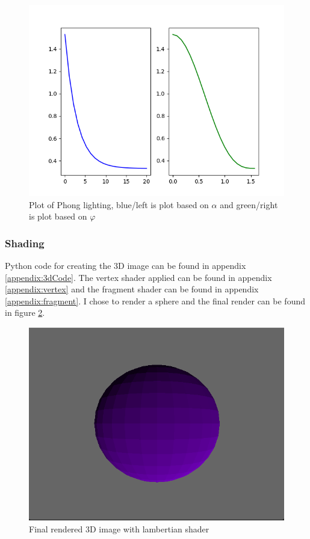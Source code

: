 \documentclass{article}
\begin{document}
\begin{figure}[H]
    \centering
    \includegraphics[width=1\textwidth]{phong.png} 
    \caption{Plot of Phong lighting, blue/left is plot based on $\alpha$ and green/right is plot based on $\varphi$}
    \label{fig:pho}
\end{figure}

\subsubsection{Shading}
Python code for creating the 3D image can be found in appendix \ref{appendix:3dCode}. The vertex shader applied can be found in appendix \ref{appendix:vertex} and the fragment shader can be found in appendix \ref{appendix:fragment}. I chose to render a sphere and the final render can be found in figure \ref{fig:sphere}.

\begin{figure}[H]
    \centering
    \includegraphics[width=1\textwidth]{sphere.png} 
    \caption{Final rendered 3D image with lambertian shader}
    \label{fig:sphere}
\end{figure}
\end{document}
